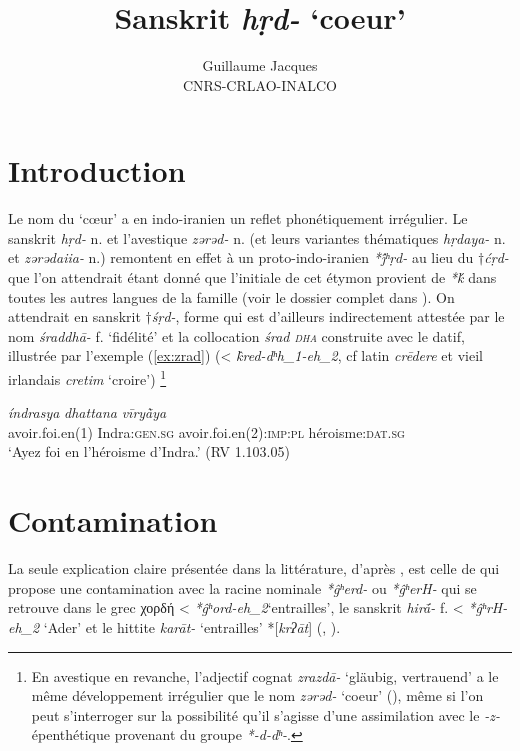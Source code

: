 \documentclass{article}
\newcommand{\ipa}[1]{{\phon\textit{#1}}}
\newcommand{\grec}[1]{{\mleccha #1}}
\begin{document}
 
\title{Sanskrit \ipa{hṛd-} `coeur'}
\author{Guillaume Jacques\\ CNRS-CRLAO-INALCO}
\maketitle
\section*{Introduction}
Le nom du `cœur' a en indo-iranien un reflet phonétiquement irrégulier. Le sanskrit \ipa{hṛd-} n. et l'avestique \ipa{zərəd-} n. (et leurs variantes thématiques \ipa{hṛdaya-} n. et \ipa{zərədaiia-} n.) remontent en effet à un proto-indo-iranien \ipa{*j́ʰṛd-} au lieu du $\dagger$\ipa{ćṛd-} que l'on attendrait étant donné que l'initiale de cet étymon provient de \ipa{*ḱ} dans toutes les autres langues de la famille (voir le dossier complet dans \citealt[417-423]{wodtko08NIL}). On attendrait en sanskrit $\dagger$\ipa{śṛd-}, forme qui est d'ailleurs  indirectement attestée par le nom \ipa{śraddhā-} f. `fidélité' et la collocation \ipa{śrad \textsc{dha}} construite avec le datif, illustrée par l'exemple (\ref{ex:zrad}) (< \ipa{k̂red-dʰh_1-eh_2}, cf latin \ipa{crēdere} et vieil irlandais \ipa{cretim} `croire') \footnote{En avestique en revanche, l'adjectif cognat \ipa{zrazdā-} `gläubig, vertrauend' a le même développement irrégulier que le nom \ipa{zərəd-} `coeur' (\citealt[663]{mayrhofer92ewa}), même si l'on peut s'interroger sur la possibilité qu'il s'agisse d'une assimilation avec le \ipa{-z-} épenthétique provenant du groupe \ipa{*-d-dʰ-}. }

\begin{exe}
\ex \label{ex:zrad}
\gll \ipa{śrád} \ipa{índrasya} \ipa{dhattana} \ipa{vīryā̀ya} \\
avoir.foi.en(1) Indra:\textsc{gen.sg} avoir.foi.en(2):\textsc{imp:pl} héroisme:\textsc{dat.sg} \\
\glt `Ayez foi en l'héroisme d'Indra.' (RV 1.103.05)
\end{exe}
 
 \section{Contamination}
La seule explication claire présentée dans la littérature, d'après \citet[420]{wodtko08NIL}, est celle de \citet{szemerenyi70heart} qui propose une contamination avec la racine nominale \ipa{*ĝʰerd-} ou \ipa{*ĝʰerH-} qui se retrouve dans le grec \grec{χορδή} < \ipa{*ĝʰord-eh_2}`entrailles', le sanskrit \ipa{hirā́-} f. < \ipa{*ĝʰrH-eh_2} `Ader' et le hittite \ipa{karāt-} `entrailles' *[\ipa{krʔāt}] (\citealt[208]{schrijver91laryngeals}, \citealt[446]{kloekhorst08edhil}).
\end{document}
